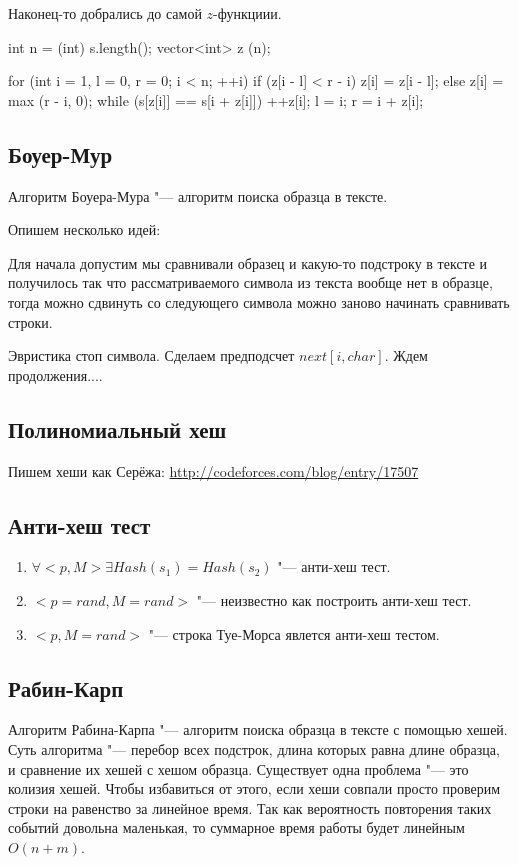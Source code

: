 Наконец-то добрались до самой $z$-функциии.

\begin{cppcode}
int n = (int) s.length();
vector<int> z (n);

for (int i = 1, l = 0, r = 0; i < n; ++i) {
  if (z[i - l] < r - i) {
    z[i] = z[i - l];
  } else {
    z[i] = max (r - i, 0);
    while (s[z[i]] == s[i + z[i]])
      ++z[i];
    l = i; 
    r = i + z[i];
  }
}
\end{cppcode} 


\subsection{Боуер-Мур}
Алгоритм Боуера-Мура "--- алгоритм поиска образца в тексте. 

Опишем несколько идей:

Для начала допустим мы сравнивали образец и какую-то подстроку в тексте и получилось так что рассматриваемого символа из текста вообще нет в образце, тогда можно сдвинуть со следующего символа можно заново начинать сравнивать строки. 

Эвристика стоп символа.
Сделаем предподсчет $next[i, char]$.
Ждем продолжения....

\subsection{Полиномиальный хеш}
Пишем хеши как Серёжа:
\url{http://codeforces.com/blog/entry/17507}

\subsection{Анти-хеш тест}

\begin{enumerate}
\item $\forall <p, M> \exists Hash(s_1) = Hash(s_2)$ "--- анти-хеш тест.
\item $<p = rand, M = rand>$ "--- неизвестно как построить анти-хеш тест.
\item $<p, M = rand>$ "--- строка Туе-Морса явлется анти-хеш тестом.
\end{enumerate}

\subsection{Рабин-Карп}

Алгоритм Рабина-Карпа "--- алгоритм поиска образца в тексте с помощью хешей.
Суть алгоритма "--- перебор всех подстрок, длина которых равна длине образца, и сравнение их хешей с хешом образца. 
Существует одна проблема "--- это колизия хешей.
Чтобы избавиться от этого, если хеши совпали просто проверим строки на равенство за линейное время. 
Так как вероятность повторения таких событий довольна маленькая, то суммарное время работы будет линейным $O (n + m)$.

